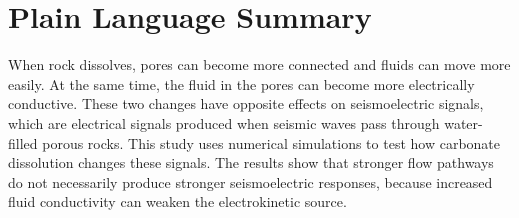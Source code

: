 \documentclass[draft]{agujournal2019}
\begin{document}
\section*{Plain Language Summary}
When rock dissolves, pores can become more connected and fluids can move more easily.
At the same time, the fluid in the pores can become more electrically conductive.
These two changes have opposite effects on seismoelectric signals, which are electrical signals produced when seismic waves pass through water-filled porous rocks.
This study uses numerical simulations to test how carbonate dissolution changes these signals.
The results show that stronger flow pathways do not necessarily produce stronger seismoelectric responses, because increased fluid conductivity can weaken the electrokinetic source.


%
%

%


%
%
%
%
\end{document}
